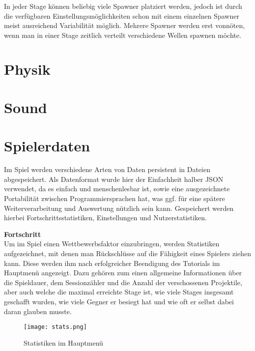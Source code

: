 In jeder Stage können beliebig viele Spawner platziert werden, jedoch ist durch die verfügbaren Einstellungsmöglichkeiten schon mit einem einzelnen Spawner meist ausreichend Variabilität möglich. Mehrere Spawner werden erst vonnöten, wenn man in einer Stage zeitlich verteilt verschiedene Wellen spawnen möchte.




\section{Physik}

\lipsum[3]



\section{Sound}

\lipsum[3]



\section{Spielerdaten}

Im Spiel werden verschiedene Arten von Daten persistent in Dateien abgespeichert. Als Datenformat wurde hier der Einfachheit halber JSON verwendet, da es einfach und menschenlesbar ist, sowie eine ausgezeichnete Portabilität zwischen Programmiersprachen hat, was ggf. für eine spätere Weiterverarbeitung und Auswertung nützlich sein kann. Gespeichert werden hierbei Fortschrittsstatistiken, Einstellungen und Nutzerstatistiken.



\textbf{Fortschritt} \\
Um im Spiel einen Wettbewerbsfaktor einzubringen, werden Statistiken aufgezeichnet, mit denen man Rückschlüsse auf die Fähigkeit eines Spielers ziehen kann. Diese werden ihm nach erfolgreicher Beendigung des Tutorials im Hauptmenü angezeigt. Dazu gehören zum einen allgemeine Informationen über die Spieldauer, dem Sessionzähler und die Anzahl der verschossenen Projektile, aber auch welche die maximal erreichte Stage ist, wie viele Stages insgesamt geschafft wurden, wie viele Gegner er besiegt hat und wie oft er selbst dabei daran glauben musste.

\begin{figure}[H]
\centering
\texttt{[image: stats.png]}
\caption{Statistiken im Hauptmenü}
\label{img:gameStats}
\end{figure}



